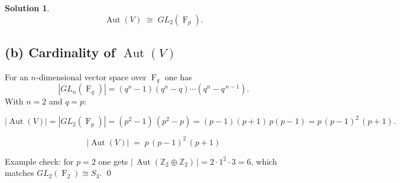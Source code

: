 \documentclass[12pt]{article}
\DeclareMathOperator{\F}{F}
\theoremstyle{definition} %
\newtheorem{solution}{Solution}
\theoremstyle{plain} %
\begin{document}
\begin{solution}
                        \[
                           \boxed{\operatorname{Aut}(V)\;\cong\;GL_{2}(\F_{p}).}
                        \]
                        
                        \subsection*{(b)  Cardinality of $\operatorname{Aut}(V)$}
                        
                        For an $n$-dimensional vector space over $\F_{q}$ one has
                        \[
                                |GL_{n}(\F_{q})|
                                = (q^{n}-1)(q^{n}-q)\cdots(q^{n}-q^{\,n-1}).
                        \]
                        With $n=2$ and $q=p$:
                        
                        \[
                        \bigl|\operatorname{Aut}(V)\bigr|
                            = |GL_{2}(\F_{p})|
                            = (p^{2}-1)\,(p^{2}-p)
                            = (p-1)(p+1)\,p(p-1)
                            = p\,(p-1)^{2}\,(p+1).
                        \]
                        
                        \[
                           \boxed{\;|\operatorname{Aut}(V)| \;=\; p\,(p-1)^{2}\,(p+1)\;}
                        \]
                        
                        \noindent
                        Example check: for $p=2$ one gets
                        $|\,\operatorname{Aut}(\mathbb{Z}_{2}\oplus\mathbb{Z}_{2})\,|=2\cdot1^{2}\cdot3=6$, which
                        matches $GL_{2}(\F_{2})\cong S_{3}$.
                        \qed
                        \end{solution}
\end{document}
